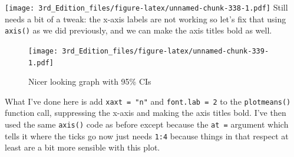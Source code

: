 \documentclass[
]{book}
\newenvironment{Shaded}{\begin{snugshade}}{\end{snugshade}}
\newcommand{\CharTok}[1]{\textcolor[rgb]{0.31,0.60,0.02}{#1}}
\newcommand{\DataTypeTok}[1]{\textcolor[rgb]{0.13,0.29,0.53}{#1}}
\newcommand{\DecValTok}[1]{\textcolor[rgb]{0.00,0.00,0.81}{#1}}
\newcommand{\FloatTok}[1]{\textcolor[rgb]{0.00,0.00,0.81}{#1}}
\newcommand{\KeywordTok}[1]{\textcolor[rgb]{0.13,0.29,0.53}{\textbf{#1}}}
\newcommand{\NormalTok}[1]{#1}
\newcommand{\OperatorTok}[1]{\textcolor[rgb]{0.81,0.36,0.00}{\textbf{#1}}}
\newcommand{\OtherTok}[1]{\textcolor[rgb]{0.56,0.35,0.01}{#1}}
\newcommand{\StringTok}[1]{\textcolor[rgb]{0.31,0.60,0.02}{#1}}
\begin{document}
\texttt{[image: 3rd\_Edition\_files/figure-latex/unnamed-chunk-338-1.pdf]}
Still needs a bit of a tweak: the x-axis labels are not working so let's fix that using \texttt{axis()} as we did previously, and we can make the axis titles bold as well.

\begin{Shaded}
\end{Shaded}

\begin{figure}
\centering
\texttt{[image: 3rd\_Edition\_files/figure-latex/unnamed-chunk-339-1.pdf]}
\caption{\label{fig:unnamed-chunk-339}Nicer looking graph with 95\% CIs}
\end{figure}

What I've done here is add \texttt{xaxt\ =\ "n"} and \texttt{font.lab\ =\ 2} to the \texttt{plotmeans()} function call, suppressing the x-axis and making the axis titles bold. I've then used the same \texttt{axis()} code as before except because the \texttt{at\ =} argument which tells it where the ticks go now just needs \texttt{1:4} because things in that respect at least are a bit more sensible with this plot.
\end{document}
